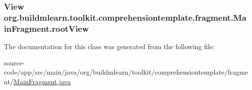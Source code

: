\subsubsection[{\texorpdfstring{root\+View}{rootView}}]{\setlength{\rightskip}{0pt plus 5cm}View org.\+buildmlearn.\+toolkit.\+comprehensiontemplate.\+fragment.\+Main\+Fragment.\+root\+View\hspace{0.3cm}{\ttfamily [private]}}\hypertarget{classorg_1_1buildmlearn_1_1toolkit_1_1comprehensiontemplate_1_1fragment_1_1MainFragment_a72ee5c1b3b5d1c3c3238cab8aeef863f}{}\label{classorg_1_1buildmlearn_1_1toolkit_1_1comprehensiontemplate_1_1fragment_1_1MainFragment_a72ee5c1b3b5d1c3c3238cab8aeef863f}


The documentation for this class was generated from the following file\+:\begin{DoxyCompactItemize}
\item 
source-\/code/app/src/main/java/org/buildmlearn/toolkit/comprehensiontemplate/fragment/\hyperlink{comprehensiontemplate_2fragment_2MainFragment_8java}{Main\+Fragment.\+java}\end{DoxyCompactItemize}
